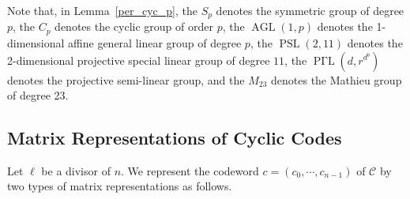 \documentclass[journal,12pt,onecolumn]{IEEEtran}
\begin{document}
Note that, in Lemma~\ref{per_cyc_p}, the \( S_p \) denotes the symmetric group of degree \( p \), the \( C_p \) denotes the cyclic group of order \( p \), the \(\operatorname{AGL}(1, p)\) denotes the 1-dimensional affine general linear group of degree \( p \), the \(\operatorname{PSL}(2,11)\) denotes the 2-dimensional projective special linear group of degree \( 11 \), the \( \operatorname{P\Gamma L}(d,r^{d^b}) \) denotes the projective semi-linear group, and the \( M_{23} \) denotes the Mathieu group of degree 23.


\subsection{Matrix Representations of Cyclic Codes}

Let $\ell$ be a divisor of $n$. We represent the codeword $c = (c_0,\cdots,c_{n-1})$ of $\mathcal{C}$ by two types of matrix representations as follows.
\end{document}
